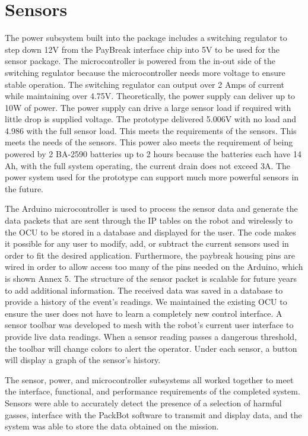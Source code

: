 \section{Sensors}\label{sec:sensors}

The power subsystem built into the package includes a switching regulator to step down 12V from the PayBreak interface chip into 5V to be used for the sensor package. The microcontroller is powered from the in-out side of the switching regulator because the microcontroller needs more voltage to ensure stable operation. The switching regulator can output over 2 Amps of current while maintaining over 4.75V. Theoretically, the power supply can deliver up to 10W of power.  The power supply can drive a large sensor load if required with little drop is supplied voltage. The prototype delivered 5.006V with no load and 4.986 with the full sensor load. This meets the requirements of the sensors. This meets the needs of the sensors. This power also meets the requirement of being powered by 2 BA-2590 batteries up to 2 hours because the batteries each have 14 Ah, with the full system operating, the current drain does not exceed 3A.  The power system used for the prototype can support much more powerful sensors in the future.

The Arduino microcontroller is used to process the sensor data and generate the data packets that are sent through the IP tables on the robot and wirelessly to the OCU to be stored in a database and displayed for the user. The code makes it possible for any user to modify, add, or subtract the current sensors used in order to fit the desired application. Furthermore, the paybreak housing pins are wired in order to allow access too many of the pins needed on the Arduino, which is shown Annex 5. The structure of the sensor packet is scalable for future years to add additional information. The received data was saved in a database to provide a history of the event's readings. We maintained the existing OCU to ensure the user does not have to learn a completely new control interface. A sensor toolbar was developed to mesh with the robot's current user interface to provide live data readings. When a sensor reading passes a dangerous threshold, the toolbar will change colors to alert the operator. Under each sensor, a button will display a graph of the sensor's history.

The sensor, power, and microcontroller subsystems all worked together to meet the interface, functional, and performance requirements of the completed system. Sensors were able to accurately detect the presence of a selection of harmful gasses, interface with the PackBot software to transmit and display data, and the system was able to store the data obtained on the mission. 
